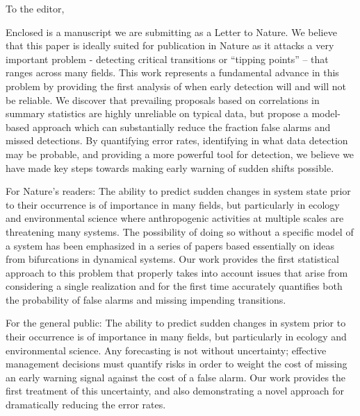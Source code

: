 \documentclass[a4paper]{letter}
\begin{document}
\address{Carl Boettiger \\
Department of Ecology and Evolution \\
University of California \\
One Shields Avenue, \\
Davis CA 95616\\
Fax: (530) 752-3350\\
Carl Boettiger: cboettig@ucdavis.edu  \\
Alan Hastings: amhastings@ucdavis.edu}
\signature{Carl B and Alan H}
\begin{letter}{ }
\opening{To the editor,}
Enclosed is a manuscript we are submitting as a Letter to Nature.  
We believe that this paper is ideally suited for publication in Nature as it attacks a very important problem -
detecting critical transitions or “tipping points” – that ranges across many fields.  
This work represents a fundamental advance in this problem by providing the first analysis of when early detection will and will not be reliable.
We discover that prevailing proposals based on correlations in summary statistics are highly unreliable on typical data,
but propose a model-based approach which can substantially reduce the fraction false alarms and missed detections.
By quantifying error rates, identifying in what data detection may be probable,
and providing a more powerful tool for detection, 
we believe we have made key steps towards making early warning of sudden shifts possible.

For Nature’s readers:
The ability to predict sudden changes in system state prior to their occurrence is of importance in many fields, but particularly in ecology and environmental science where anthropogenic activities at multiple scales are threatening many systems.  The possibility of doing so without a specific model of a system has been emphasized in a series of papers based essentially on ideas from bifurcations in dynamical systems.  Our work provides the first statistical approach to this problem that properly takes into account issues that arise from considering a single realization and for the first time accurately quantifies both the probability of false alarms and missing impending transitions.

For the general public:
The ability to predict sudden changes in system prior to their occurrence is of importance in many fields, but particularly in ecology and environmental science.  Any forecasting is not without uncertainty; effective management decisions must quantify risks in order to weight the cost of missing an early warning signal against the cost of a false alarm.  Our work provides the first treatment of this uncertainty, and also demonstrating a novel approach for dramatically reducing the error rates.  


\end{letter}
\end{document}
